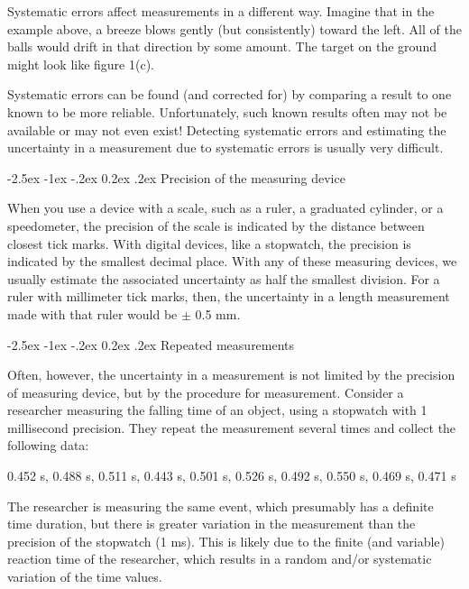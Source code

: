 \documentclass[11pt]{article}
\makeatletter
\renewcommand\subsection{\@startsection {subsection}{2}{\z@}%
     {-2.5ex \@plus -1ex \@minus -.2ex}%
     {0.2ex \@plus.2ex}%
    {\bfseries\large}}
\makeatother
\begin{document}
Systematic errors affect measurements in a different way. Imagine that in the 
example above, a breeze blows gently (but consistently) toward the left. All of the 
balls would drift in that direction by some amount. The target on the ground 
might look like figure 1(c).

Systematic errors can be found (and corrected for) by comparing a result to one 
known to be more reliable. Unfortunately, such known results often may not be available 
or may not even exist! Detecting systematic errors and estimating the uncertainty 
in a measurement due to systematic errors is usually very difficult.

\subsection{Precision of the measuring device}

When you use a device with a scale, such as a ruler, a graduated cylinder, or 
a speedometer, the precision of the scale is indicated by the distance between 
closest tick marks. With digital devices, like a stopwatch, the precision is 
indicated by the smallest decimal place. With any of these measuring devices, we 
usually estimate the associated uncertainty as half the smallest division. For a 
ruler with millimeter tick marks, then, the uncertainty in a length measurement 
made with that ruler would be $\pm$ 0.5 mm.

\subsection{Repeated measurements}

Often, however, the uncertainty in a measurement is not limited by the 
precision of measuring device, but by the procedure for measurement. Consider a 
researcher measuring the falling time of an object, using a stopwatch with 1 
millisecond precision. They repeat the measurement several times and collect the 
following data:

0.452 s, 0.488 s, 0.511 s, 0.443 s, 0.501 s, 0.526 s, 0.492 s, 0.550 s, 0.469 s, 
0.471 s

The researcher is measuring the same event, which presumably has a definite time 
duration, but there is greater variation in the measurement than the precision 
of the stopwatch (1 ms). This is likely due to the finite (and variable) reaction 
time of the researcher, which results in a random and/or systematic variation of 
the time values. 
\end{document}
